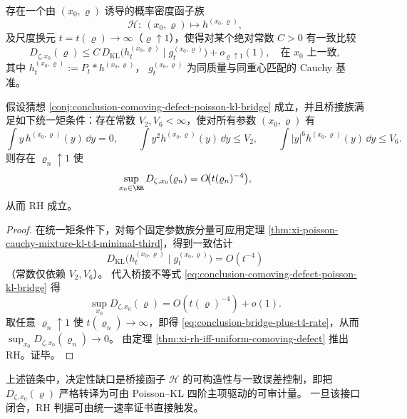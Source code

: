\begin{conjecture}\label{conj:conclusion-comoving-defect-poisson-kl-bridge}
存在一个由 \((x_0,\varrho)\) 诱导的概率密度函子族
\[
\mathscr H:\ (x_0,\varrho)\mapsto h^{(x_0,\varrho)},
\]
及尺度换元 \(t=t(\varrho)\to\infty\)（\(\varrho\uparrow 1\)），使得对某个绝对常数 \(C>0\) 有一致比较
\begin{equation}\label{eq:conclusion-comoving-defect-poisson-kl-bridge}
\boxed{\;
D_{\zeta,x_0}(\varrho)
\le
C\,D_{\mathrm{KL}}\!\bigl(h_{t}^{(x_0,\varrho)}\mid g_t^{(x_0,\varrho)}\bigr)
+o_{\varrho\uparrow 1}(1),\quad \text{在 }x_0\text{ 上一致},\;}
\end{equation}
其中
\(
h_t^{(x_0,\varrho)}:=P_t*h^{(x_0,\varrho)}
\)，
\(g_t^{(x_0,\varrho)}\) 为同质量与同重心匹配的 Cauchy 基准。
\end{conjecture}

\begin{theorem}\label{thm:conclusion-bridge-plus-t4-implies-rh-rate}
假设猜想 \ref{conj:conclusion-comoving-defect-poisson-kl-bridge} 成立，并且桥接族满足如下统一矩条件：存在常数 \(V_2,V_6<\infty\)，使对所有参数 \((x_0,\varrho)\) 有
\[
\int y\,h^{(x_0,\varrho)}(y)\,\dd y=0,\qquad
\int y^2 h^{(x_0,\varrho)}(y)\,\dd y\le V_2,\qquad
\int |y|^6 h^{(x_0,\varrho)}(y)\,\dd y\le V_6.
\]
则存在 \(\varrho_n\uparrow 1\) 使
\begin{equation}\label{eq:conclusion-bridge-plus-t4-rate}
\sup_{x_0\in\RR}D_{\zeta,x_0}(\varrho_n)=O\!\bigl(t(\varrho_n)^{-4}\bigr),
\end{equation}
从而 RH 成立。
\end{theorem}
\begin{proof}
在统一矩条件下，对每个固定参数族分量可应用定理
\ref{thm:xi-poisson-cauchy-mixture-kl-t4-minimal-third}，得到一致估计
\[
D_{\mathrm{KL}}\!\bigl(h_t^{(x_0,\varrho)}\mid g_t^{(x_0,\varrho)}\bigr)
=O(t^{-4})
\]
（常数仅依赖 \(V_2,V_6\)）。
代入桥接不等式 \eqref{eq:conclusion-comoving-defect-poisson-kl-bridge} 得
\[
\sup_{x_0}D_{\zeta,x_0}(\varrho)=O(t(\varrho)^{-4})+o(1).
\]
取任意 \(\varrho_n\uparrow 1\) 使 \(t(\varrho_n)\to\infty\)，即得
\eqref{eq:conclusion-bridge-plus-t4-rate}，从而
\(
\sup_{x_0}D_{\zeta,x_0}(\varrho_n)\to 0
\)。
由定理 \ref{thm:xi-rh-iff-uniform-comoving-defect} 推出 RH。证毕。
\end{proof}

\begin{remark}[结构性缺口的精确位置]\label{rem:conclusion-comoving-defect-poisson-kl-gap}
上述链条中，决定性缺口是桥接函子 \(\mathscr H\) 的可构造性与一致误差控制，即把
\(D_{\zeta,x_0}(\varrho)\)
严格转译为可由 Poisson--KL 四阶主项驱动的可审计量。
一旦该接口闭合，RH 判据可由统一速率证书直接触发。
\end{remark}
